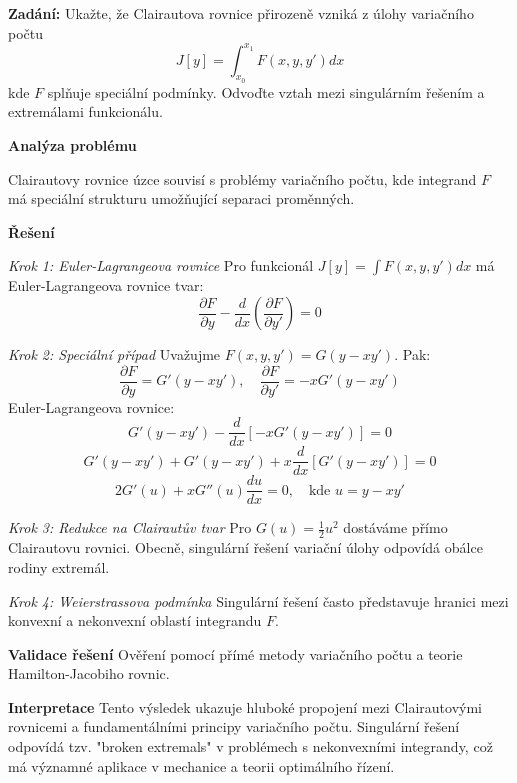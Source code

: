 \begin{example}
\label{ex:varacni-pocet}

\noindent\textbf{Zadání:} Ukažte, že Clairautova rovnice přirozeně vzniká z úlohy variačního počtu
\[
J[y] = \int_{x_0}^{x_1} F(x, y, y') dx
\]
kde $F$ splňuje speciální podmínky. Odvoďte vztah mezi singulárním řešením a extremálami funkcionálu.

\vspace{1.5\baselineskip}

\noindent\textbf{Analýza problému}

Clairautovy rovnice úzce souvisí s problémy variačního počtu, kde integrand $F$ má speciální strukturu umožňující separaci proměnných.

\vspace{1.5\baselineskip}

\noindent\textbf{Řešení}

\noindent\textit{Krok 1: Euler-Lagrangeova rovnice}
Pro funkcionál $J[y] = \int F(x, y, y') dx$ má Euler-Lagrangeova rovnice tvar:
\[
\frac{\partial F}{\partial y} - \frac{d}{dx}\left(\frac{\partial F}{\partial y'}\right) = 0
\]

\vspace{1\baselineskip}

\noindent\textit{Krok 2: Speciální případ}
Uvažujme $F(x, y, y') = G(y - xy')$. Pak:
\[
\frac{\partial F}{\partial y} = G'(y - xy'), \quad \frac{\partial F}{\partial y'} = -xG'(y - xy')
\]
Euler-Lagrangeova rovnice:
\[
G'(y - xy') - \frac{d}{dx}[-xG'(y - xy')] = 0
\]
\[
G'(y - xy') + G'(y - xy') + x\frac{d}{dx}[G'(y - xy')] = 0
\]
\[
2G'(u) + xG''(u)\frac{du}{dx} = 0, \quad \text{kde } u = y - xy'
\]

\vspace{1\baselineskip}

\noindent\textit{Krok 3: Redukce na Clairautův tvar}
Pro $G(u) = \frac{1}{2}u^2$ dostáváme přímo Clairautovu rovnici. Obecně, singulární řešení variační úlohy odpovídá obálce rodiny extremál.

\vspace{1\baselineskip}

\noindent\textit{Krok 4: Weierstrassova podmínka}
Singulární řešení často představuje hranici mezi konvexní a nekonvexní oblastí integrandu $F$.

\vspace{1.5\baselineskip}

\noindent\textbf{Validace řešení}
Ověření pomocí přímé metody variačního počtu a teorie Hamilton-Jacobiho rovnic.

\vspace{1.5\baselineskip}

\noindent\textbf{Interpretace}
Tento výsledek ukazuje hluboké propojení mezi Clairautovými rovnicemi a fundamentálními principy variačního počtu. Singulární řešení odpovídá tzv. "broken extremals" v problémech s nekonvexními integrandy, což má významné aplikace v mechanice a teorii optimálního řízení.

\end{example}

